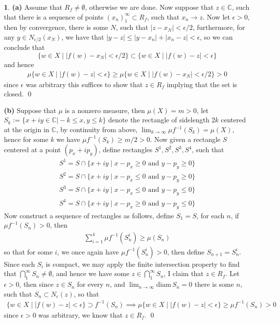 \documentclass[11pt]{article}
\theoremstyle{definition}
\newtheorem{pb}{}
\newcommand{\set}[1]{\{#1\}}
\newcommand{\abs}[1]{\left\vert#1\right\vert}
\newcommand{\tand}{\text{ and }}
\begin{document}
    \begin{pb}
        \textbf{(a)} Assume that \(R_f \neq \emptyset\), otherwise we are done. Now suppose that \(z \in \mathbb{C}\), such that there is a sequence of points \((x_n)_1^\infty \subset R_f\), such that \(x_n \to z\). Now let \(\epsilon > 0\), then by convergence, there is some \(N\), such that \(\abs{z - x_N} < \epsilon/2\), furthermore, for any \(y \in N_{\epsilon/2}(x_N)\), we have that \(\abs{y - z} \leq \abs{y - x_n} + \abs{x_n - z} < \epsilon\), so we can conclude that 
        \[\set{w \in X \mid \abs{f(w) - x_N} < \epsilon/2} \subset \set{w \in X \mid \abs{f(w) - z} < \epsilon}\]
        and hence
        \begin{align*}
            \mu\set{w \in X \mid \abs{f(w) - z} < \epsilon} \geq \mu\set{w \in X \mid \abs{f(w) - x_N} < \epsilon/2} > 0
        \end{align*}
        since \(\epsilon\) was arbitrary this suffices to show that \(z \in R_f\) implying that the set is closed. \qed

        \textbf{(b)} Suppose that \(\mu\) is a nonzero measure, then \(\mu(X) = m > 0\), let \(S_k := \set{x + iy \in \mathbb{C} \vert -k \leq x,y \leq k}\) denote the rectangle of sidelength \(2k\) centered at the origin in \(\mathbb{C}\), by continuity from above, \(\lim_{k\to\infty}\mu f^{-1}(S_k) = \mu(X)\), hence for some \(k\) we have \(\mu f^{-1}(S_k) \geq m/2 > 0\). Now given a rectangle \(S\) centered at a point \((p_x+ ip_y)\), define rectangles \(S^1,S^2,S^3,S^4\), such that 
        \begin{align*}
            S^1 = S \cap \set{x + iy \mid x - p_x \geq 0 \tand y - p_y \geq 0} \\
            S^2 = S \cap \set{x + iy \mid x - p_x \leq 0 \tand y - p_y \geq 0} \\
            S^3 = S \cap \set{x + iy \mid x - p_x \leq 0 \tand y - p_y \leq 0} \\
            S^4 = S \cap \set{x + iy \mid x - p_x \geq 0 \tand y - p_y \leq 0}
        \end{align*}
        Now construct a sequence of rectangles as follows, define \(S_1 = S\), for each \(n\), if \(\mu f^{-1}(S_n) > 0\), then
        \begin{align*}
            \sum_{i = 1}^4 \mu f^{-1}(S_n^i) \geq \mu(S_n)
        \end{align*}
        so that for some \(i\), we once again have \(\mu f^{-1}(S_n^i) > 0\), then define \(S_{n+1} = S_n^i\). Since each \(S_i\) is compact, we may apply the finite intersection property to find that \(\bigcap_1^\infty S_n \neq \emptyset\), and hence we have some \(z \in \bigcap_1^\infty S_n\), I claim that \(z \in R_f\). Let \(\epsilon > 0\), then since \(z \in S_n\) for every \(n\), and \(\lim_{n\to \infty} \text{diam}\, S_n = 0\) there is some \(n\), such that \(S_n \subset N_\epsilon(z)\), so that
        \begin{align*}
            \set{w \in X \mid \abs{f(w) - z} < \epsilon} \supset f^{-1}(S_n) \implies \mu\set{w \in X \mid \abs{f(w) - z} < \epsilon} \geq \mu f^{-1}(S_n) > 0
        \end{align*}
        since \(\epsilon > 0\) was arbitrary, we know that \(z \in R_f\). \qed


\end{pb}
\end{document}

